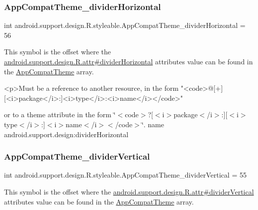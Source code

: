 \subsubsection{\texorpdfstring{App\+Compat\+Theme\+\_\+divider\+Horizontal}{AppCompatTheme\_dividerHorizontal}}
{\footnotesize\ttfamily int android.\+support.\+design.\+R.\+styleable.\+App\+Compat\+Theme\+\_\+divider\+Horizontal = 56\hspace{0.3cm}{\ttfamily [static]}}

This symbol is the offset where the \hyperlink{classandroid_1_1support_1_1design_1_1R_1_1attr_a9109377b1757939e39799dd20017a3fd}{android.\+support.\+design.\+R.\+attr\#divider\+Horizontal} attribute\textquotesingle{}s value can be found in the \hyperlink{classandroid_1_1support_1_1design_1_1R_1_1styleable_afb351dc8de20cbd4c89abe360373010c}{App\+Compat\+Theme} array.

\begin{DoxyVerb}      <p>Must be a reference to another resource, in the form "<code>@[+][<i>package</i>:]<i>type</i>:<i>name</i></code>"
\end{DoxyVerb}
 or to a theme attribute in the form \char`\"{}$<$code$>$?\mbox{[}$<$i$>$package$<$/i$>$\+:\mbox{]}\mbox{[}$<$i$>$type$<$/i$>$\+:\mbox{]}$<$i$>$name$<$/i$>$$<$/code$>$\char`\"{}.  name android.\+support.\+design\+:divider\+Horizontal \mbox{\label{classandroid_1_1support_1_1design_1_1R_1_1styleable_a8a5a682e061f30c7bd82fc522c70f245}} 
\subsubsection{\texorpdfstring{App\+Compat\+Theme\+\_\+divider\+Vertical}{AppCompatTheme\_dividerVertical}}
{\footnotesize\ttfamily int android.\+support.\+design.\+R.\+styleable.\+App\+Compat\+Theme\+\_\+divider\+Vertical = 55\hspace{0.3cm}{\ttfamily [static]}}

This symbol is the offset where the \hyperlink{classandroid_1_1support_1_1design_1_1R_1_1attr_a994f6b92e9866888f5c764eedab456f9}{android.\+support.\+design.\+R.\+attr\#divider\+Vertical} attribute\textquotesingle{}s value can be found in the \hyperlink{classandroid_1_1support_1_1design_1_1R_1_1styleable_afb351dc8de20cbd4c89abe360373010c}{App\+Compat\+Theme} array.

